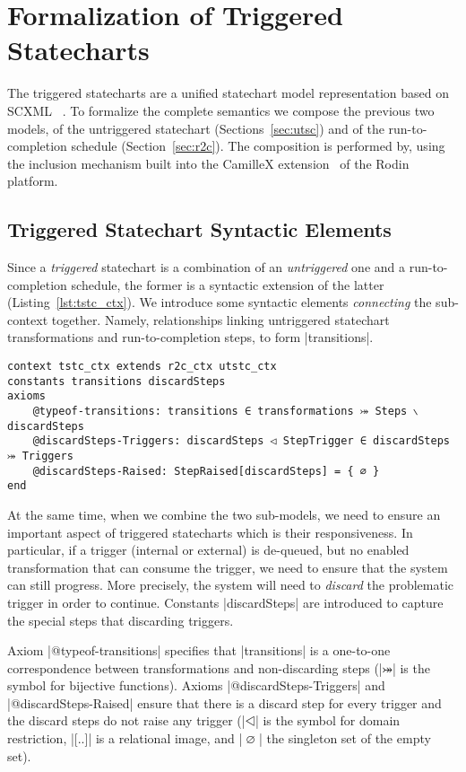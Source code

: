 \section{Formalization of Triggered Statecharts}
\label{sec:tstc}

The triggered statecharts are a unified statechart model representation based 
on SCXML ~\cite{scxmlwebsite}. To formalize the complete semantics we compose the previous two models, of the untriggered statechart (Sections~\ref{sec:utsc}) and of the run-to-completion schedule (Section~\ref{sec:r2c}).
The composition is performed by, using the inclusion mechanism built into the CamilleX extension~\cite{DBLP:conf/sefm/HoangSDFB22} of the Rodin platform.

\subsection{Triggered Statechart Syntactic Elements}
\label{sec:tstc-syntax}
Since a \emph{triggered} statechart is a combination of an \emph{untriggered} one and a run-to-completion schedule, the former is a syntactic extension of the latter (Listing~\ref{lst:tstc_ctx}). We introduce some syntactic elements \emph{connecting} the sub-context together. Namely, relationships linking untriggered statechart transformations and run-to-completion steps, to form |transitions|.

\begin{lstlisting}[language=Event-B, caption = {Context for Triggered Statechart}, label = {lst:tstc_ctx}]
context tstc_ctx extends r2c_ctx utstc_ctx
constants transitions discardSteps
axioms
	@typeof-transitions: transitions ∈ transformations ⤖ Steps ∖ discardSteps
	@discardSteps-Triggers: discardSteps ◁ StepTrigger ∈ discardSteps ⤖ Triggers
	@discardSteps-Raised: StepRaised[discardSteps] = { ∅ }
end
\end{lstlisting}

At the same time, when we combine the two sub-models, we need to ensure an important aspect of triggered statecharts which is their responsiveness. In particular, if a trigger (internal or external) is de-queued, but no enabled transformation that can consume the trigger, we need to ensure that the system can still progress. More precisely, the system will need to \emph{discard} the problematic trigger in order to continue. Constants |discardSteps| are introduced to capture the special steps that discarding triggers.

Axiom |@typeof-transitions| specifies that |transitions| is a one-to-one correspondence between transformations and non-discarding steps (|⤖| is the symbol for bijective functions). Axioms |@discardSteps-Triggers| and |@discardSteps-Raised| ensure that there is a discard step for every trigger and the discard steps do not raise any trigger (|◁| is the symbol for domain restriction, |[..]| is a relational image, and |{ ∅ }| the singleton set of the empty set).

